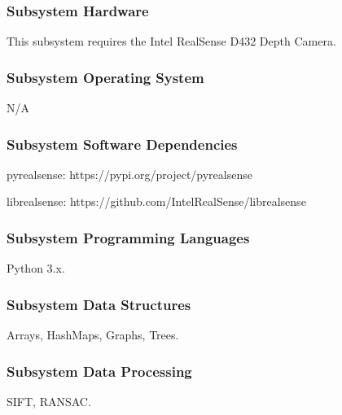 \subsubsection{Subsystem Hardware}
This subsystem requires the Intel RealSense  D432 Depth Camera.

\subsubsection{Subsystem Operating System}
N/A 

\subsubsection{Subsystem Software Dependencies}
pyrealsense: https://pypi.org/project/pyrealsense

librealsense: https://github.com/IntelRealSense/librealsense


\subsubsection{Subsystem Programming Languages}
Python 3.x.

\subsubsection{Subsystem Data Structures}
Arrays, HashMaps, Graphs, Trees.

\subsubsection{Subsystem Data Processing}
SIFT, RANSAC.


